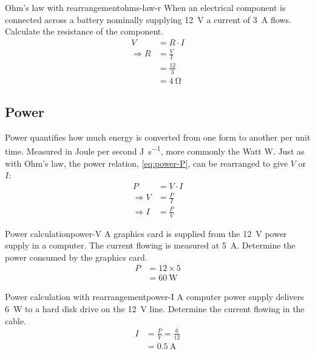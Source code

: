 \documentclass{pgnotes}
\begin{document}
\begin{example}{Ohm's law with rearrangement}{ohms-law-r}
  When an electrical component is connected across a battery nominally supplying \SI{12}{\volt} a current of \SI{3}{\ampere} flows.
  Calculate the resistance of the component.
  \tcblower
  \begin{align}
    V & = R \cdot I \\
    \Rightarrow R & = \frac{V}{I} \\
      & = \frac{12}{3} \\
      & = \SI{4}{\ohm}
  \end{align}
\end{example}

\subsection{Power}

Power quantifies how much energy is converted from one form to another per unit time. Measured in Joule per second \si{\joule\per\second}, more commonly the Watt \si{\watt}.
Just as with Ohm's law, the power relation, \autoref{eq:power-P}, can be rearranged to give $V$ or $I$:
\begin{align}
  P & = V \cdot I \label{eq:power-P} \\
  \Rightarrow V & = \frac{P}{I} \label{eq:power-V} \\
  \Rightarrow I & = \frac{P}{V} \label{eq:power-I} 
\end{align}

\begin{example}{Power calculation}{power-V}
  A graphics card is supplied from the \SI{12}{\volt} power supply in a computer. The current flowing is measured at \SI{5}{\ampere}. Determine the power consumed by the graphics card.
  \tcblower
  \begin{align}
    P & = 12 \times 5 \\
      & = \SI{60}{\watt} 
  \end{align}
\end{example}

\begin{example}{Power calculation with rearrangement}{power-I}
  A computer power supply delivers \SI{6}{\watt} to a hard disk drive on the \SI{12}{\volt} line.
  Determine the current flowing in the cable.
  \tcblower
  \begin{align}
     I & = \frac{P}{V} = \frac{6}{12} \\
      & = \SI{0.5}{\ampere}
  \end{align}
\end{example}
\end{document}
